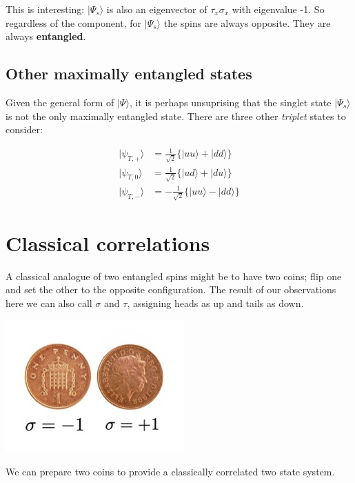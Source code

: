 \documentclass[]{tufte-handout}
\begin{document}
This is interesting: \(|\Psi_s\rangle\) is also an eigenvector of \(\tau_x\sigma_x\) with eigenvalue -1. So regardless of the component, for \(|\Psi_s\rangle\) the spins are always opposite. They are always \textbf{entangled}.

\hypertarget{other-maximally-entangled-states}{%
\subsection{Other maximally entangled states}\label{other-maximally-entangled-states}}

Given the general form of \(|\Psi\rangle\), it is perhaps unsuprising that the singlet state \(|\Psi_s\rangle\) is not the only maximally entangled state. There are three other \emph{triplet} states to consider:

\[
\begin{aligned}
|\psi_{T,+}\rangle &= \frac{1}{\sqrt{2}} \Big\{ |uu\rangle + |dd\rangle \Big\} \\
|\psi_{T,0}\rangle &= \frac{1}{\sqrt{2}} \Big\{ |ud\rangle + |du\rangle \Big\} \\
|\psi_{T,-}\rangle &= - \frac{1}{\sqrt{2}} \Big\{ |uu\rangle - |dd\rangle \Big\}
\end{aligned}
\]

\hypertarget{classical-correlations}{%
\section{Classical correlations}\label{classical-correlations}}

A classical analogue of two entangled spins might be to have two coins; flip one and set the other to the opposite configuration. The result of our observations here we can also call \(\sigma\) and \(\tau\), assigning heads as up and tails as down.

\begin{marginfigure}

{\centering \includegraphics{img/coins} 

}

\caption[We can prepare two coins to provide a classically correlated two state system]{We can prepare two coins to provide a classically correlated two state system. }\label{fig:unnamed-chunk-4}
\end{marginfigure}
\end{document}

